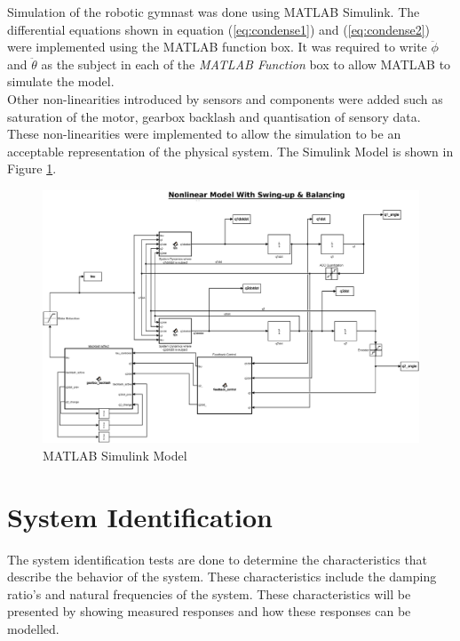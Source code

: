 Simulation of the robotic gymnast was done using MATLAB Simulink. The differential equations shown in equation (\ref{eq:condense1}) and (\ref{eq:condense2}) were implemented using the MATLAB function box. It was required to write $\ddot{\phi}$ and $\ddot{\theta}$ as the subject in each of the \textit{MATLAB Function} box to allow MATLAB to simulate the model.\\

Other non-linearities introduced by sensors and components were added such as saturation of the motor, gearbox backlash and quantisation of sensory data. These non-linearities were implemented to allow the simulation to be an acceptable representation of the physical system. The Simulink Model is shown in Figure \ref{fig:sim_nonlinearfeedback}.

\begin{figure}[h]
	\centering
	\includegraphics[scale=0.3]{./figs/simulink/simulink_model.eps}
	\caption{MATLAB Simulink Model}
	\label{fig:sim_nonlinearfeedback}
\end{figure}

\section{System Identification}

The system identification tests are done to determine the characteristics that describe the behavior of the system. These characteristics include the damping ratio's and natural frequencies of the system. These characteristics will be presented by showing measured responses and how these responses can be modelled. \\


